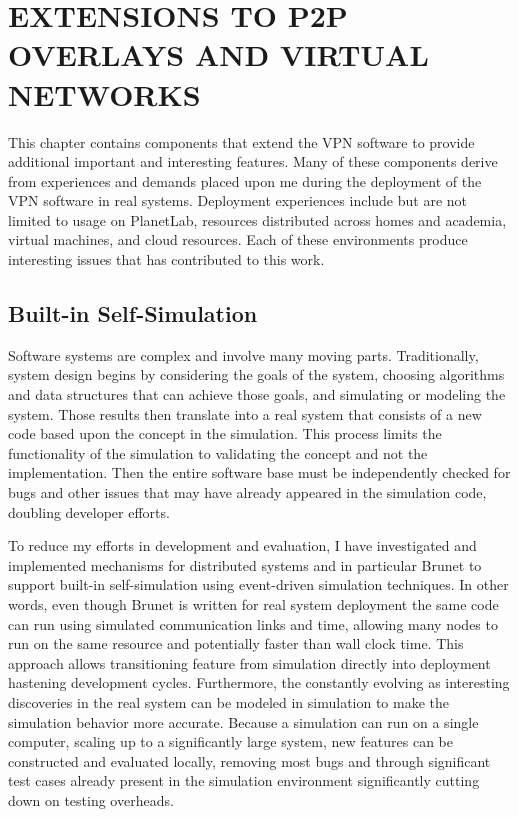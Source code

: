 \chapter{EXTENSIONS TO P2P OVERLAYS AND VIRTUAL NETWORKS}
\label{chap:extensions}

This chapter contains components that extend the VPN software to provide
additional important and interesting features.  Many of these components derive
from experiences and demands placed upon me during the deployment of the VPN
software in real systems.  Deployment experiences include but are not limited
to usage on PlanetLab, resources distributed across homes and academia, virtual
machines, and cloud resources.  Each of these environments produce interesting
issues that has contributed to this work.

\section{Built-in Self-Simulation}

Software systems are complex and involve many moving parts.  Traditionally,
system design begins by considering the goals of the system, choosing
algorithms and data structures that can achieve those goals, and simulating or
modeling the system.  Those results then translate into a real system that
consists of a new code based upon the concept in the simulation.  This process
limits the functionality of the simulation to validating the concept and not
the implementation.  Then the entire software base must be independently
checked for bugs and other issues that may have already appeared in the
simulation code, doubling developer efforts.  

To reduce my efforts in development and evaluation, I have investigated and
implemented mechanisms for distributed systems and in particular Brunet to
support built-in self-simulation using event-driven simulation techniques.  In
other words, even though Brunet is written for real system deployment the same
code can run using simulated communication links and time, allowing many nodes
to run on the same resource and potentially faster than wall clock time.  This
approach allows transitioning feature from simulation directly into deployment
hastening development cycles.  Furthermore, the constantly evolving as
interesting discoveries in the real system can be modeled in simulation to make
the simulation behavior more accurate.  Because a simulation can run on a
single computer, scaling up to a significantly large system, new features can
be constructed and evaluated locally, removing most bugs and through
significant test cases already present in the simulation environment
significantly cutting down on testing overheads.


